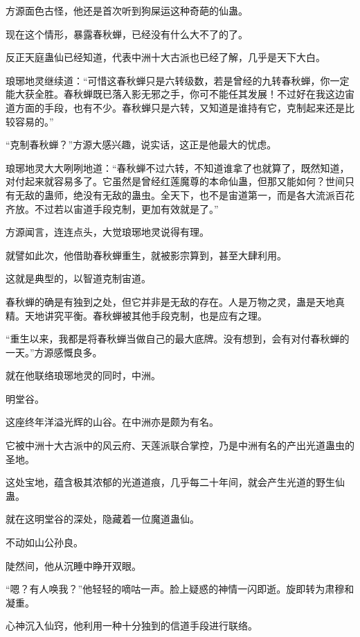
\begin{this_body}

方源面色古怪，他还是首次听到狗屎运这种奇葩的仙蛊。

现在这个情形，暴露春秋蝉，已经没有什么大不了的了。

反正天庭蛊仙已经知道，代表中洲十大古派也已经了解，几乎是天下大白。

琅琊地灵继续道：“可惜这春秋蝉只是六转级数，若是曾经的九转春秋蝉，你一定能大获全胜。春秋蝉既已落入影无邪之手，你可不能任其发展！不过好在我这边宙道方面的手段，也有不少。春秋蝉只是六转，又知道是谁持有它，克制起来还是比较容易的。”

“克制春秋蝉？”方源大感兴趣，说实话，这正是他最大的忧虑。

琅琊地灵大大咧咧地道：“春秋蝉不过六转，不知道谁拿了也就算了，既然知道，对付起来就容易多了。它虽然是曾经红莲魔尊的本命仙蛊，但那又能如何？世间只有无敌的蛊师，绝没有无敌的蛊虫。全天下，也不是宙道第一，而是各大流派百花齐放。不过若以宙道手段克制，更加有效就是了。”

方源闻言，连连点头，大觉琅琊地灵说得有理。

就譬如此次，他借助春秋蝉重生，就被影宗算到，甚至大肆利用。

这就是典型的，以智道克制宙道。

春秋蝉的确是有独到之处，但它并非是无敌的存在。人是万物之灵，蛊是天地真精。天地讲究平衡。春秋蝉被其他手段克制，也是应有之理。

“重生以来，我都是将春秋蝉当做自己的最大底牌。没有想到，会有对付春秋蝉的一天。”方源感慨良多。

就在他联络琅琊地灵的同时，中洲。

明堂谷。

这座终年洋溢光辉的山谷。在中洲亦是颇为有名。

它被中洲十大古派中的风云府、天莲派联合掌控，乃是中洲有名的产出光道蛊虫的圣地。

这处宝地，蕴含极其浓郁的光道道痕，几乎每二十年间，就会产生光道的野生仙蛊。

就在这明堂谷的深处，隐藏着一位魔道蛊仙。

不动如山公孙良。

陡然间，他从沉睡中睁开双眼。

“嗯？有人唤我？”他轻轻的嘀咕一声。脸上疑惑的神情一闪即逝。旋即转为肃穆和凝重。

心神沉入仙窍，他利用一种十分独到的信道手段进行联络。


\end{this_body}
